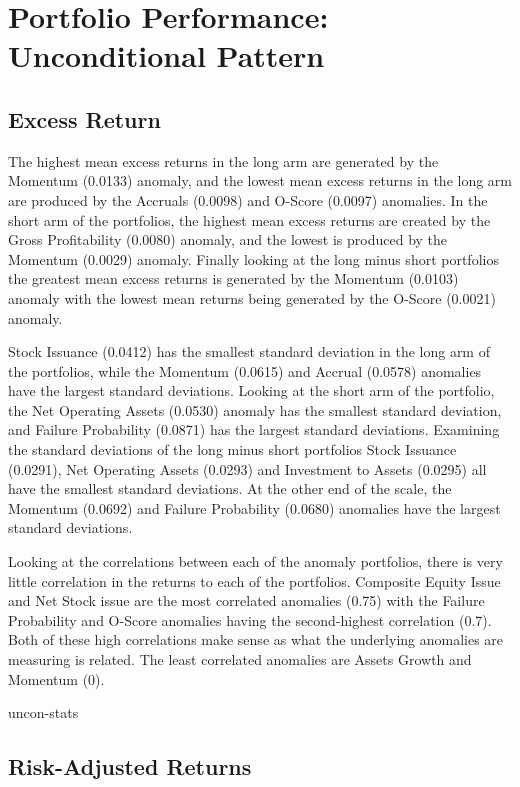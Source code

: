 \documentclass[12pt, a4paper, oneside]{article}
\begin{document}
\section{Portfolio Performance: Unconditional Pattern}\label{sec:unconditional}
\subsection{Excess Return }
The highest mean excess returns in the long arm are generated by the Momentum (0.0133) anomaly, and the lowest mean excess returns in the long arm are produced by the Accruals (0.0098) and O-Score (0.0097) anomalies. In the short arm of the portfolios, the highest mean excess returns are created by the Gross Profitability (0.0080) anomaly, and the lowest is produced by the Momentum (0.0029) anomaly. Finally looking at the long minus short portfolios the greatest mean excess returns is generated by the Momentum (0.0103) anomaly with the lowest mean returns being generated by the O-Score (0.0021) anomaly.

Stock Issuance (0.0412) has the smallest standard deviation in the long arm of the portfolios, while the Momentum (0.0615) and Accrual (0.0578) anomalies have the largest standard deviations. Looking at the short arm of the portfolio, the Net Operating Assets (0.0530) anomaly has the smallest standard deviation, and Failure Probability (0.0871) has the largest standard deviations. Examining the standard deviations of the long minus short portfolios Stock Issuance (0.0291), Net Operating Assets (0.0293) and Investment to Assets (0.0295) all have the smallest standard deviations. At the other end of the scale, the Momentum (0.0692) and Failure Probability (0.0680) anomalies have the largest standard deviations.

Looking at the correlations between each of the anomaly portfolios, there is very little correlation in the returns to each of the portfolios. Composite Equity Issue and Net Stock issue are the most correlated anomalies (0.75) with the Failure Probability and O-Score anomalies having the second-highest correlation (0.7). Both of these high correlations make sense as what the underlying anomalies are measuring is related. The least correlated anomalies are Assets Growth and Momentum (0).

{uncon-stats}

\subsection{Risk-Adjusted Returns}
\end{document}
